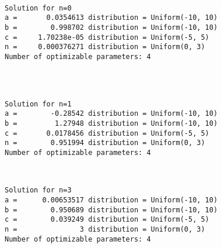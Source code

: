 \documentclass[11pt]{article}
\begin{document}
    \begin{center}
    \end{center}
    { \hspace*{\fill} \\}
    
    \begin{Verbatim}[commandchars=\\\{\}]
Solution for n=0
a =       0.0354613 distribution = Uniform(-10, 10)
b =        0.998702 distribution = Uniform(-10, 10)
c =     1.70238e-05 distribution = Uniform(-5, 5)
n =     0.000376271 distribution = Uniform(0, 3)
Number of optimizable parameters: 4
    \end{Verbatim}

    \begin{center}
    \end{center}
    { \hspace*{\fill} \\}
    
    \begin{Verbatim}[commandchars=\\\{\}]

Solution for n=1
a =        -0.28542 distribution = Uniform(-10, 10)
b =         1.27948 distribution = Uniform(-10, 10)
c =       0.0178456 distribution = Uniform(-5, 5)
n =        0.951994 distribution = Uniform(0, 3)
Number of optimizable parameters: 4
    \end{Verbatim}

    \begin{center}
    \end{center}
    { \hspace*{\fill} \\}
    
    \begin{Verbatim}[commandchars=\\\{\}]
Solution for n=3
a =      0.00653517 distribution = Uniform(-10, 10)
b =        0.950689 distribution = Uniform(-10, 10)
c =        0.039249 distribution = Uniform(-5, 5)
n =               3 distribution = Uniform(0, 3)
Number of optimizable parameters: 4
    \end{Verbatim}
\end{document}
